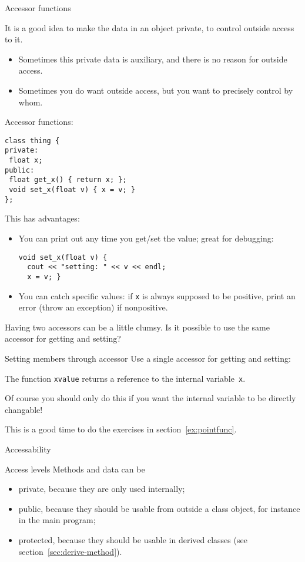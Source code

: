  {Accessor functions}

It is a good idea to make the data in an object private,
to control outside access to it.
\begin{itemize}
\item Sometimes this private data is auxiliary, and there is no reason
  for outside access.
\item Sometimes you do want outside access, but you want to precisely
  control by whom.
\end{itemize}

Accessor functions:
\begin{lstlisting}
class thing {
private:
 float x;
public:
 float get_x() { return x; };
 void set_x(float v) { x = v; }
};
\end{lstlisting}
This has advantages:
\begin{itemize}
\item You can print out any time you get/set the value; great for
  debugging:
\begin{lstlisting}
void set_x(float v) {
  cout << "setting: " << v << endl;
  x = v; }
\end{lstlisting}
\item You can catch specific values: if \lstinline{x} is always supposed to be
  positive, print an error (throw an exception) if nonpositive.
\end{itemize}

Having two accessors can be a little clumsy. Is it possible to use the
same accessor for getting and setting?

\begin{block}{Setting members through accessor}
  \label{sl:setmember}
  Use a single accessor for getting and setting:

  The function \lstinline{xvalue} returns a reference to the internal
  variable~\lstinline{x}.
\end{block}

Of course you should only do this if you want the internal variable to
be directly changable!

\begin{exercise}
  This is a good time to do the exercises in section~\ref{ex:pointfunc}.
\end{exercise}

 {Accessability}

\begin{block}{Access levels}
  \label{sl:private-etc}
  Methods and data can be 
  \begin{itemize}
  \item private, because they are only used internally;
  \item public, because they should be usable from outside a class
    object, for instance in the main program;
  \item protected, because they should be usable in derived classes (see
    section~\ref{sec:derive-method}).
  \end{itemize}
\end{block}

